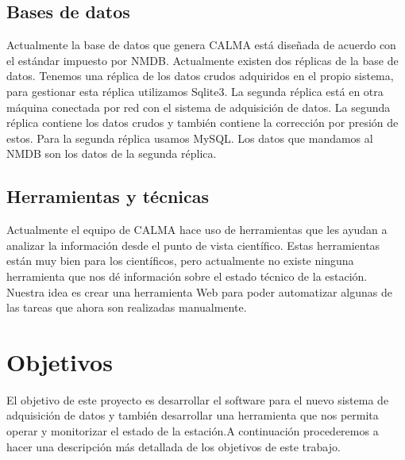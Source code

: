 	\subsection{Bases de datos}
		Actualmente la base de datos que genera CALMA está diseñada de acuerdo con el estándar impuesto por NMDB. Actualmente existen dos réplicas
		de la base de datos. Tenemos una réplica de los datos crudos adquiridos en el propio sistema, para gestionar esta réplica utilizamos Sqlite3. La
		segunda réplica está en otra máquina conectada por red con el sistema de adquisición de datos. La segunda réplica contiene los datos crudos y 
		también contiene la corrección por presión de estos. Para la segunda réplica usamos MySQL. Los datos que mandamos al NMDB son los datos de la 
		segunda réplica.
	\subsection{Herramientas y técnicas}
		Actualmente el equipo de CALMA hace uso de herramientas que les ayudan a analizar la información desde el punto de vista científico. Estas 
		herramientas están muy bien para los científicos, pero actualmente no existe ninguna herramienta que nos dé información sobre el estado técnico 
		de la estación. Nuestra idea es crear una herramienta Web para poder automatizar algunas de las tareas que ahora son realizadas manualmente. 


\section{Objetivos}
	El objetivo de este proyecto es desarrollar el software para el nuevo sistema de adquisición de datos y también desarrollar una herramienta
	que nos permita operar y monitorizar el estado de la estación.A continuación procederemos a hacer una descripción más detallada de los objetivos
	de este trabajo.  
